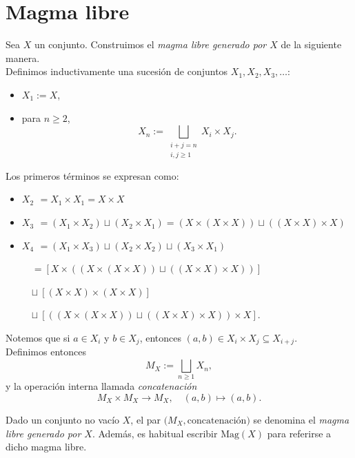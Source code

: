 \section{Magma libre}

\noindent Sea \(X\) un conjunto. Construimos el \emph{magma libre generado por \(X\)} de la siguiente manera.\\

\noindent Definimos inductivamente una sucesión de conjuntos \(X_1, X_2, X_3, \dots\):

\begin{itemize}
	\item \(X_1 := X\),
	\item para \(n \geq 2\), 
	\[
	X_n := \bigsqcup_{\substack{i + j = n \\ i,j \geq 1}} X_i \times X_j.
	\]
\end{itemize}

\begin{observacion}
	\upshape
	Los primeros términos se expresan como:
\begin{itemize}
	\item \(X_2 \:\,= X_1 \times X_1 = X \times X\)
	\item \(X_3 \:\,= (X_1 \times X_2) \sqcup (X_2 \times X_1) = (X \times (X \times X)) \sqcup ((X \times X) \times X)\)
	\item \(X_4 \:\,= (X_1 \times X_3) \sqcup (X_2 \times X_2) \sqcup (X_3 \times X_1)\)
	
	\quad\ \, \(= \left[X \times ((X \times (X \times X)) \sqcup ((X \times X) \times X))\right]\)
	
	\quad	\quad\ \, \(\sqcup\ \left[(X \times X) \times (X \times X)\right]\)
	
	\quad\quad\ \, \(\sqcup\ \left[((X \times (X \times X)) \sqcup ((X \times X) \times X)) \times X\right]\).
\end{itemize}
\end{observacion}

\noindent Notemos que si \(a \in X_i\) y \(b \in X_j\), entonces \((a,b) \in X_i \times X_j \subseteq X_{i+j}\). \\

\noindent Definimos entonces
\[
M_X := \bigsqcup_{n \geq 1} X_n,
\]
y la operación interna llamada \emph{concatenación}
\[
M_X \times M_X \longrightarrow  M_X, \quad (a,b) \longmapsto (a,b).
\]

\begin{definicion}
	\upshape
	Dado un conjunto no vacío \(X\), el par \(\bigl(M_X, \text{concatenación}\bigr)\) se denomina el \emph{magma libre generado por \(X\)}. Además, es habitual escribir \(\mathrm{Mag}(X)\) para referirse a dicho magma libre.
\end{definicion}


